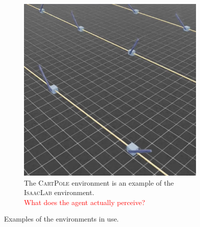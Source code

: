 \documentclass[10pt]{article} %
\begin{document}
\begin{figure}
\begin{subfigure}[b]{0.32\textwidth}
    \includegraphics[width=\textwidth]{figures/isaac.png}
    \caption{The \textsc{CartPole} environment is an example of the \textsc{IsaacLab} environment.\\\textcolor{red}{What does the agent actually perceive?}\\}
    \label{fig:sample-env-isaac}
  \end{subfigure}
  \caption{Examples of the environments in use.}
  \label{fig:environmnents}
\end{figure}
\end{document}

